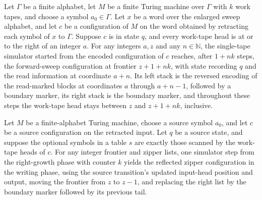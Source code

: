 \begin{lemma}
\label{Turing.FinTM.dg_collect}
\leanok
{}
Let $\Gamma$ be a finite alphabet, let $M$ be a finite Turing machine over $\Gamma$ with
$k$ work tapes, and choose a symbol $a_0\in\Gamma$. Let $x$ be a word over the enlarged
sweep alphabet, and let $c$ be a configuration of $M$ on the word obtained by retracting
each symbol of $x$ to $\Gamma$. Suppose $c$ is in state $q$, and every work-tape head is
at or to the right of an integer $a$. For any integers $a,z$ and any $n\in\mathbb N$,
the single-tape simulator started from the encoded configuration of $c$ reaches, after
$1+nk$ steps, the forward-sweep configuration at frontier $z+1+nk$, with state recording
$q$ and the read information at coordinate $a+n$. Its left stack is the reversed
encoding of the read-marked blocks at coordinates $a$ through $a+n-1$, followed by a
boundary marker, its right stack is the boundary marker, and throughout these steps the
work-tape head stays between $z$ and $z+1+nk$, inclusive.
\end{lemma}

\begin{lemma}
\label{Turing.FinTM.dg_turn}
\leanok
{}
Let $M$ be a finite-alphabet Turing machine, choose a source symbol $a_0$, and let $c$
be a source configuration on the retracted input. Let $q$ be a source state, and suppose
the optional symbols in a table $s$ are exactly those scanned by the work-tape heads of
$c$. For any integer frontier and zipper lists, one simulator step from the right-growth
phase with counter $k$ yields the reflected zipper configuration in the writing phase,
using the source transition's updated input-head position and output, moving the
frontier from $z$ to $z-1$, and replacing the right list by the boundary marker followed
by its previous tail.
\end{lemma}

